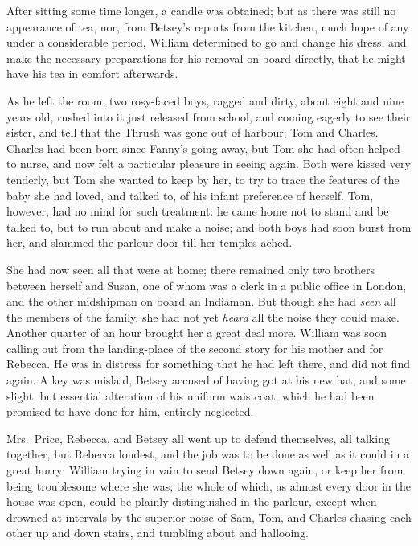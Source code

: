 After sitting some time longer, a candle was obtained;
but as there was still no appearance of tea, nor, from
Betsey's reports from the kitchen, much hope of any under
a considerable period, William determined to go and change
his dress, and make the necessary preparations for his removal
on board directly, that he might have his tea in comfort
afterwards.

As he left the room, two rosy-faced boys, ragged and dirty,
about eight and nine years old, rushed into it just released
from school, and coming eagerly to see their sister,
and tell that the Thrush was gone out of harbour;
Tom and Charles.  Charles had been born since Fanny's
going away, but Tom she had often helped to nurse,
and now felt a particular pleasure in seeing again.
Both were kissed very tenderly, but Tom she wanted
to keep by her, to try to trace the features of the baby
she had loved, and talked to, of his infant preference
of herself.  Tom, however, had no mind for such treatment:
he came home not to stand and be talked to, but to run about
and make a noise; and both boys had soon burst from her,
and slammed the parlour-door till her temples ached.

She had now seen all that were at home; there remained
only two brothers between herself and Susan,
one of whom was a clerk in a public office in London,
and the other midshipman on board an Indiaman.
But though she had \emph{seen} all the members of the family,
she had not yet \emph{heard} all the noise they could make.
Another quarter of an hour brought her a great deal more.
William was soon calling out from the landing-place
of the second story for his mother and for Rebecca.
He was in distress for something that he had left there,
and did not find again.  A key was mislaid, Betsey accused
of having got at his new hat, and some slight, but essential
alteration of his uniform waistcoat, which he had been
promised to have done for him, entirely neglected.

Mrs.\ Price, Rebecca, and Betsey all went up to defend themselves,
all talking together, but Rebecca loudest, and the job
was to be done as well as it could in a great hurry;
William trying in vain to send Betsey down again, or keep
her from being troublesome where she was; the whole of which,
as almost every door in the house was open, could be plainly
distinguished in the parlour, except when drowned at intervals
by the superior noise of Sam, Tom, and Charles chasing
each other up and down stairs, and tumbling about and hallooing.

